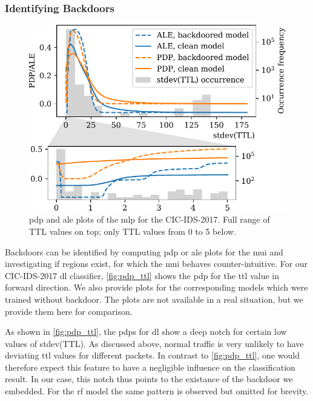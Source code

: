 \documentclass[10pt,sigconf,letterpaper,dvipsnames]{acmart}
\newcommand{\cic}{CIC-IDS-2017}
\begin{document}
\subsubsection{Identifying Backdoors}
\begin{figure}[h]
\includegraphics[width=\columnwidth]{figures/pdpale2017nn_joint.pdf}

\caption{\gls{pdp} and \gls{ale} plots of the \gls{mlp} for the \cic{}. Full range of TTL values on top; only TTL values from 0 to 5 below.}
\label{fig:pdp_ttl}
\end{figure}
Backdoors can be identified by computing \gls{pdp} or \gls{ale} plots for the \gls{mui} and investigating if regions exist, for which the \gls{mui} behaves counter-intuitive. For our CIC-IDS-2017 \gls{dl} classifier, \autoref{fig:pdp_ttl} shows the \gls{pdp} for the \gls{ttl} value in forward direction. We also provide plots for the corresponding models which were trained without backdoor. The plots are not available in a real situation, but we provide them here for comparison.

As shown in \autoref{fig:pdp_ttl}, the \glspl{pdp} for \gls{dl} show a deep notch for certain low values of stdev(TTL). As discussed above, normal traffic is very unlikely to have deviating \gls{ttl} values for different packets. In contrast to \autoref{fig:pdp_ttl}, one would therefore expect this feature to have a negligible influence on the classification result. In our case, this notch thus points to the existance of the backdoor we embedded. For the \gls{rf} model the same pattern is observed but omitted for brevity.
\end{document}
